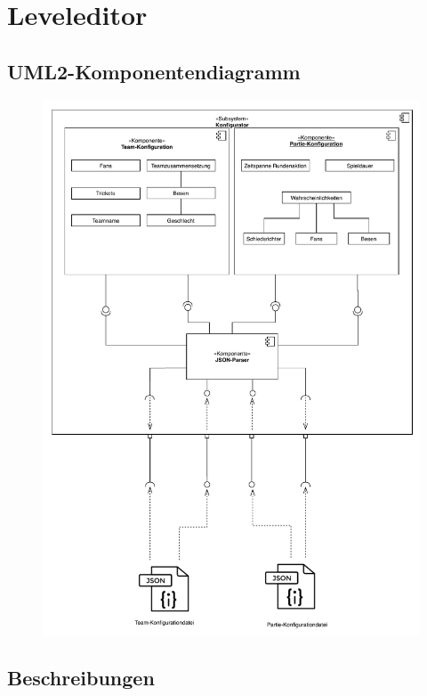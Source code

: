 \section{Leveleditor}

	\subsection{UML2-Komponentendiagramm}
		\newpage
		\begin{figure}[H]
    		\centering
    		 \includegraphics[scale=0.75]{images/Leveleditor.pdf}
		\end{figure}

	\subsection{Beschreibungen}

